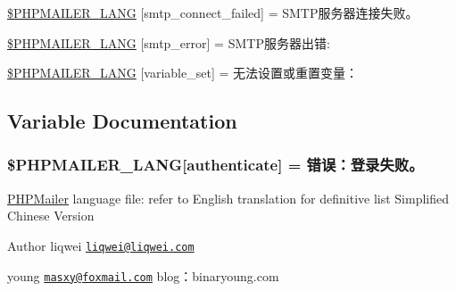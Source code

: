 \begin{DoxyCompactItemize}
\item 
\hyperlink{phpmailer_8lang-zh__cn_8php_a7b321d4ca1e9df702403ed4c61aa0980}{\$\+P\+H\+P\+M\+A\+I\+L\+E\+R\+\_\+\+L\+A\+NG} \mbox{[}\textquotesingle{}smtp\+\_\+connect\+\_\+failed\textquotesingle{}\mbox{]} = \textquotesingle{}S\+M\+T\+P服务器连接失败。\textquotesingle{}
\item 
\hyperlink{phpmailer_8lang-zh__cn_8php_a7d9cffba1e669c845f8a4c891ee50064}{\$\+P\+H\+P\+M\+A\+I\+L\+E\+R\+\_\+\+L\+A\+NG} \mbox{[}\textquotesingle{}smtp\+\_\+error\textquotesingle{}\mbox{]} = \textquotesingle{}S\+M\+T\+P服务器出错\+: \textquotesingle{}
\item 
\hyperlink{phpmailer_8lang-zh__cn_8php_af795debc7a739d038742691c358d9032}{\$\+P\+H\+P\+M\+A\+I\+L\+E\+R\+\_\+\+L\+A\+NG} \mbox{[}\textquotesingle{}variable\+\_\+set\textquotesingle{}\mbox{]} = \textquotesingle{}无法设置或重置变量：\textquotesingle{}
\end{DoxyCompactItemize}


\subsection{Variable Documentation}
\subsubsection[{\texorpdfstring{\$\+P\+H\+P\+M\+A\+I\+L\+E\+R\+\_\+\+L\+A\+NG}{$PHPMAILER_LANG}}]{\setlength{\rightskip}{0pt plus 5cm}\$P\+H\+P\+M\+A\+I\+L\+E\+R\+\_\+\+L\+A\+NG\mbox{[}\textquotesingle{}authenticate\textquotesingle{}\mbox{]} =  错误：登录失败。\textquotesingle{}}\hypertarget{phpmailer_8lang-zh__cn_8php_a2cb33073c989b85580748e331ed8b4aa}{}\label{phpmailer_8lang-zh__cn_8php_a2cb33073c989b85580748e331ed8b4aa}
\hyperlink{class_p_h_p_mailer}{P\+H\+P\+Mailer} language file\+: refer to English translation for definitive list Simplified Chinese Version \begin{DoxyAuthor}{Author}
liqwei \href{mailto:liqwei@liqwei.com}{\tt liqwei@liqwei.\+com} 

young \href{mailto:masxy@foxmail.com}{\tt masxy@foxmail.\+com} blog：binaryoung.\+com 
\end{DoxyAuthor}


